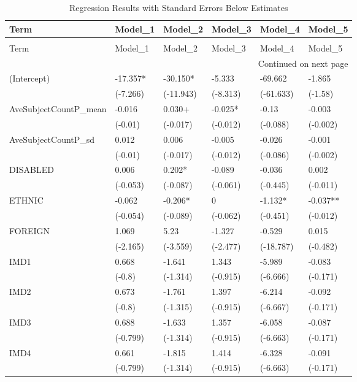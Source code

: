 \begin{longtable}{llllll}
\caption{Regression Results with Standard Errors Below Estimates} \\
\toprule
Term & Model_1 & Model_2 & Model_3 & Model_4 & Model_5 \\
\midrule
\endfirsthead
\caption[]{Regression Results with Standard Errors Below Estimates} \\
\toprule
Term & Model_1 & Model_2 & Model_3 & Model_4 & Model_5 \\
\midrule
\endhead
\midrule
\multicolumn{6}{r}{Continued on next page} \\
\midrule
\endfoot
\bottomrule
\endlastfoot
(Intercept) & -17.357* & -30.150* & -5.333 & -69.662 & -1.865 \\
 & (-7.266) & (-11.943) & (-8.313) & (-61.633) & (-1.58) \\
AveSubjectCountP\_mean & -0.016 & 0.030+ & -0.025* & -0.13 & -0.003 \\
 & (-0.01) & (-0.017) & (-0.012) & (-0.088) & (-0.002) \\
AveSubjectCountP\_sd & 0.012 & 0.006 & -0.005 & -0.026 & -0.001 \\
 & (-0.01) & (-0.017) & (-0.012) & (-0.086) & (-0.002) \\
DISABLED & 0.006 & 0.202* & -0.089 & -0.036 & 0.002 \\
 & (-0.053) & (-0.087) & (-0.061) & (-0.445) & (-0.011) \\
ETHNIC & -0.062 & -0.206* & 0 & -1.132* & -0.037** \\
 & (-0.054) & (-0.089) & (-0.062) & (-0.451) & (-0.012) \\
FOREIGN & 1.069 & 5.23 & -1.327 & -0.529 & 0.015 \\
 & (-2.165) & (-3.559) & (-2.477) & (-18.787) & (-0.482) \\
IMD1 & 0.668 & -1.641 & 1.343 & -5.989 & -0.083 \\
 & (-0.8) & (-1.314) & (-0.915) & (-6.666) & (-0.171) \\
IMD2 & 0.673 & -1.761 & 1.397 & -6.214 & -0.092 \\
 & (-0.8) & (-1.315) & (-0.915) & (-6.667) & (-0.171) \\
IMD3 & 0.688 & -1.633 & 1.357 & -6.058 & -0.087 \\
 & (-0.799) & (-1.314) & (-0.915) & (-6.663) & (-0.171) \\
IMD4 & 0.661 & -1.815 & 1.414 & -6.328 & -0.091 \\
 & (-0.799) & (-1.314) & (-0.915) & (-6.663) & (-0.171) \\

\end{longtable}
